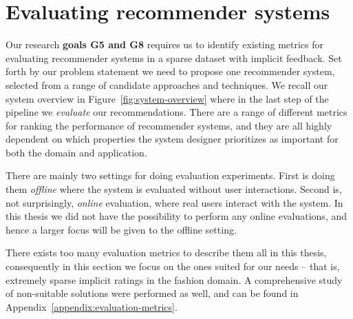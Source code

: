\section{Evaluating recommender systems}
\label{sec:evaluation}

Our research \textbf{goals G5 and G8} requires us to identify existing metrics
for evaluating recommender systems in a sparse dataset with implicit feedback.
Set forth by our problem statement we need to propose one recommender system,
selected from a range of candidate approaches and techniques. We recall our
system overview in Figure~\ref{fig:system-overview} where in the last step of
the pipeline we \textit{evaluate} our recommendations. There are a range of
different metrics for ranking the performance of recommender systems, and they
are all highly dependent on which properties the system designer prioritizes as
important for both the domain and application.

There are mainly two settings for doing evaluation experiments. First is doing
them \textit{offline} where the system is evaluated without user interactions.
Second is, not surprisingly, \textit{online} evaluation, where real users
interact with the system. In this thesis we did not have the possibility to
perform any online evaluations, and hence a larger focus will be given to the
offline setting.

There exists too many evaluation metrics to describe them all in this thesis,
consequently in this section we focus on the ones suited for our needs – that
is, extremely sparse implicit ratings in the fashion domain. A comprehensive
study of non-suitable solutions were performed as well, and can be found in
Appendix~\ref{appendix:evaluation-metrics}.

